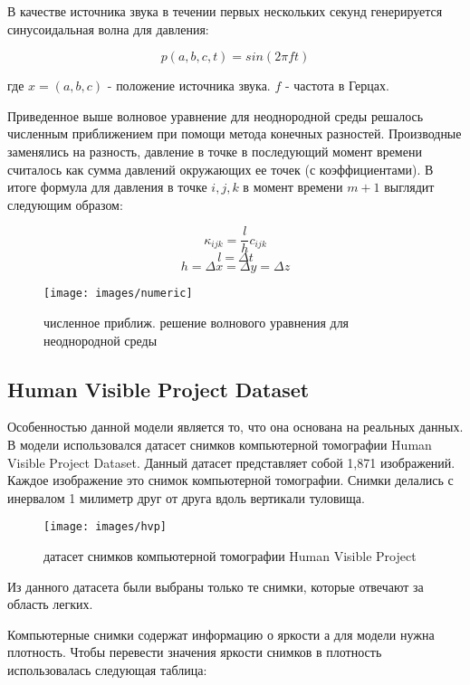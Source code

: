 \documentclass[../main.tex]{subfiles}
\begin{document}
В качестве источника звука в течении первых нескольких секунд генерируется синусоидальная волна для давления:

$$p(a, b, c, t) = sin(2 \pi f t)$$

где $x = (a, b, c)$ - положение источника звука. $f$ - частота в Герцах.

Приведенное выше волновое уравнение для неоднородной среды решалось численным приближением при помощи метода конечных разностей. Производные заменялись на разность, давление в точке в последующий момент времени считалось как сумма давлений окружающих ее точек (с коэффициентами). В итоге формула для давления в точке $i, j, k$ в момент времени $m + 1$ выглядит следующим образом:

$$\kappa_{ijk} = \frac{l}{h}c_{ijk}$$
$$l = \Delta t$$
$$h = \Delta x = \Delta y = \Delta z$$

\begin{figure}[H]
\centering
\texttt{[image: images/numeric]}
\caption{численное приближ. решение волнового уравнения для неоднородной среды}
\end{figure}

\subsection{Human Visible Project Dataset}
Особенностью данной модели является то, что она основана на реальных данных. В модели использовался датасет снимков компьютерной томографии Human Visible Project Dataset. Данный датасет представляет собой 1,871 изображений. Каждое изображение это снимок компьютерной томографии. Снимки делались с инервалом 1 милиметр друг от друга вдоль вертикали туловища.

\begin{figure}[H]
\centering
\texttt{[image: images/hvp]}
\caption{датасет снимков компьютерной томографии Human Visible Project}
\end{figure}
Из данного датасета были выбраны только те снимки, которые отвечают за область легких.

Компьютерные снимки содержат информацию о яркости а для модели нужна плотность. Чтобы перевести значения яркости снимков в плотность использовалась следующая таблица:
\end{document}
